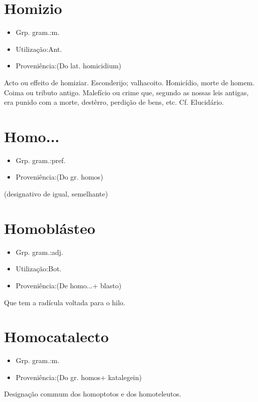\documentclass{article}
\begin{document}
\section{Homizio}
\begin{itemize}
\item {Grp. gram.:m.}
\end{itemize}
\begin{itemize}
\item {Utilização:Ant.}
\end{itemize}
\begin{itemize}
\item {Proveniência:(Do lat. \textunderscore homicidium\textunderscore )}
\end{itemize}
Acto ou effeito de homiziar.
Esconderijo; valhacoito.
Homicídio, morte de homem.
Coima ou tributo antigo.
Malefício ou crime que, segundo as nossas leis antigas, era punido com a morte, destêrro, perdição de bens, etc. Cf. \textunderscore Elucidário\textunderscore .
\section{Homo...}
\begin{itemize}
\item {Grp. gram.:pref.}
\end{itemize}
\begin{itemize}
\item {Proveniência:(Do gr. \textunderscore homos\textunderscore )}
\end{itemize}
(designativo de igual, semelhante)
\section{Homoblásteo}
\begin{itemize}
\item {Grp. gram.:adj.}
\end{itemize}
\begin{itemize}
\item {Utilização:Bot.}
\end{itemize}
\begin{itemize}
\item {Proveniência:(De \textunderscore homo...\textunderscore  + \textunderscore blasto\textunderscore )}
\end{itemize}
Que tem a radícula voltada para o hilo.
\section{Homocatalecto}
\begin{itemize}
\item {Grp. gram.:m.}
\end{itemize}
\begin{itemize}
\item {Proveniência:(Do gr. \textunderscore homos\textunderscore  + \textunderscore katalegein\textunderscore )}
\end{itemize}
Designação commum dos homoptotos e dos homoteleutos.
\end{document}

